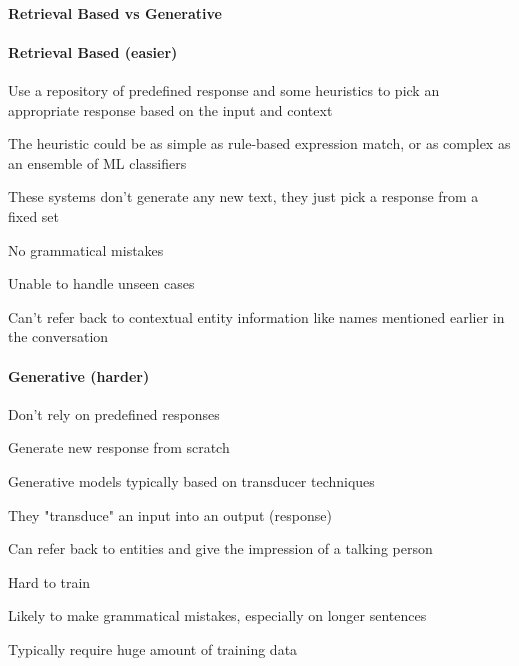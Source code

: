 \documentclass[10pt]{report}
\begin{document}
\paragraph{Retrieval Based vs Generative}
\begin{multicols}{2}
\paragraph{Retrieval Based (easier)}
\begin{list}{}{}
	\item Use a repository of predefined response and some heuristics to pick an appropriate response based on the input and context
	\item The heuristic could be as simple as rule-based expression match, or as complex as an ensemble of ML classifiers
	\item These systems don't generate any new text, they just pick a response from a fixed set
	\item No grammatical mistakes
	\item Unable to handle unseen cases
	\item Can't refer back to contextual entity information like names mentioned earlier in the conversation
\end{list}
\paragraph{Generative (harder)}
\begin{list}{}{}
	\item Don't rely on predefined responses
	\item Generate new response from scratch
	\item Generative models typically based on transducer techniques
	\item They "transduce" an input into an output (response)
	\item Can refer back to entities and give the impression of a talking person
	\item Hard to train
	\item Likely to make grammatical mistakes, especially on longer sentences
	\item Typically require huge amount of training data
\end{list}
\end{multicols}
\end{document}
